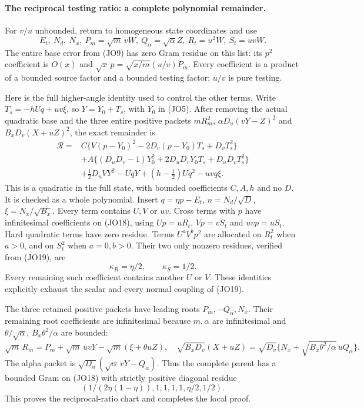 \paragraph{The reciprocal testing ratio: a complete polynomial remainder.}
For $v/u$ unbounded, return to homogeneous state coordinates and use
\[
 E_t,\ N_d,\ N_x,\ P_m=\sqrt m\,vW,\ Q_\alpha=\sqrt\alpha Z,
                  \ R_t=u^2W,\ S_t=uvW.              \tag{JO18}
\]
The entire base error from (JO9) has zero Gram residue on this list:
its $p^2$ coefficient is $O(x)$ and
$\sqrt x\,p=\sqrt{x/m}(u/v)P_m$. Every coefficient is a product
of a bounded source factor and a bounded testing factor; $u/v$ is
pure testing.

Here is the full higher-angle identity used to control the other terms.
Write $T_s=-hUq+uv\xi$, so $Y=Y_0+T_s$, with $Y_0$ in
(JO5). After removing the actual quadratic base and the three entire
positive packets $mR_m^2$, $\alpha D_u(vY-Z)^2$ and
$B_xD_v(X+uZ)^2$, the exact remainder is
\[
 \begin{aligned}
 \mathcal R={}&C\{V(p-Y_0)^2-2D_v(p-Y_0)T_s+D_vT_s^2\}\\
 &+A\{(D_uD_v-1)Y_0^2+2D_uD_vY_0T_s+D_uD_vT_s^2\}\\
 &+\tfrac12D_uVY^2-UqY+(h-\tfrac12)Uq^2-uvq\xi .
 \end{aligned}                                                \tag{JO19}
\]
This is a quadratic in the full state, with bounded coefficients
$C,A,h$ and no $D$. It is checked as a whole polynomial. Insert
$q=\eta p-E_t$, $n=N_d/\sqrt D$, $\xi=N_x/\sqrt{B_x}$.
Every term contains $U,V$ or $uv$. Cross terms with $p$ have
infinitesimal coefficients on (JO18), using $Up=uR_t$,
$Vp=vS_t$ and $uvp=uS_t$. Hard quadratic terms have zero
residue. Terms $U^aV^bp^2$ are allocated on $R_t^2$ when
$a>0$, and on $S_t^2$ when $a=0,b>0$. Their two only nonzero
residues, verified from (JO19), are
\[
                         \kappa_R=\eta/2,\qquad
                         \kappa_S=1/2.               \tag{JO20}
\]
Every remaining such coefficient contains another $U$ or $V$.
These identities explicitly exhaust the scalar and every normal
coupling of (JO19).

The three retained positive packets have leading roots
$P_m,-Q_\alpha,N_x$. Their remaining root coefficients are
infinitesimal because $m,\alpha$ are infinitesimal and
$\theta/\sqrt\alpha$, $B_x\theta^2/\alpha$ are bounded:
\[
 \sqrt m\,R_m=P_m+\sqrt m\,uvY-\sqrt m(\xi+\theta uZ),
 \quad
 \sqrt{B_xD_v}(X+uZ)=
 \sqrt{D_v}\{N_x+\sqrt{B_x\theta^2/\alpha}\,uQ_\alpha\}.
\]
The alpha packet is $\sqrt{D_u}(\sqrt\alpha\,vY-Q_\alpha)$.
Thus the complete parent has a bounded Gram on (JO18) with strictly
positive diagonal residue
\[
             (1/(2\eta(1-\eta)),1,1,1,1,\eta/2,1/2).
                                                               \tag{JO21}
\]
This proves the reciprocal-ratio chart and completes the local proof.

